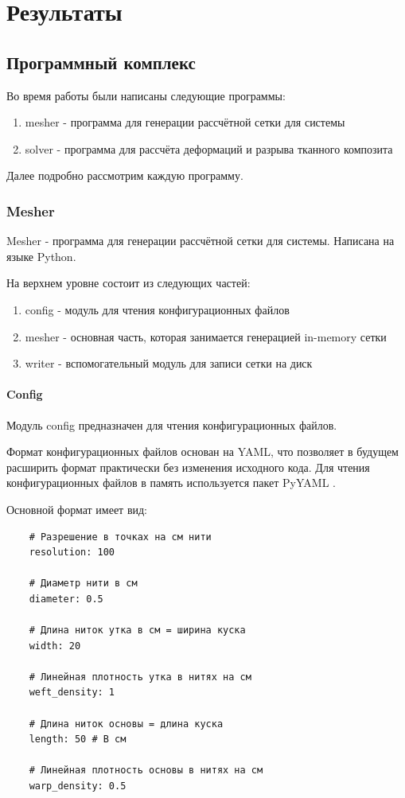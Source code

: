 \chapter{Результаты}\label{ch:results}

\section*{Программный комплекс}
Во время работы были написаны следующие программы:
\begin{enumerate}
    \item mesher - программа для генерации рассчётной сетки для системы
    \item solver - программа для рассчёта деформаций и разрыва тканного композита
\end{enumerate}
Далее подробно рассмотрим каждую программу.

\subsection*{Mesher}
Mesher - программа для генерации рассчётной сетки для системы.
Написана на языке Python.

На верхнем уровне состоит из следующих частей:
\begin{enumerate}
    \item config - модуль для чтения конфигурационных файлов
    \item mesher - основная часть, которая занимается генерацией in-memory сетки
    \item writer - вспомогательный модуль для записи сетки на диск
\end{enumerate}

\subsubsection*{Config}
Модуль config предназначен для чтения конфигурационных файлов.

Формат конфигурационных файлов основан на YAML, что позволяет в будущем расширить формат практически без
изменения исходного кода.
Для чтения конфигурационных файлов в память используется пакет PyYAML .

Основной формат имеет вид:
\begin{verbatim}
    # Разрешение в точках на см нити
    resolution: 100

    # Диаметр нити в см
    diameter: 0.5

    # Длина ниток утка в см = ширина куска
    width: 20

    # Линейная плотность утка в нитях на см
    weft_density: 1

    # Длина ниток основы = длина куска
    length: 50 # В см

    # Линейная плотность основы в нитях на см
    warp_density: 0.5
\end{verbatim}

